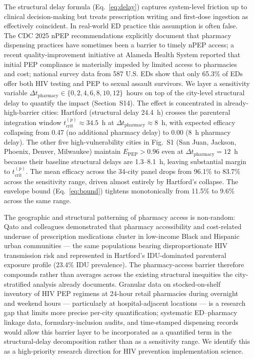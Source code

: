 \documentclass[10pt,letterpaper]{article}
\theoremstyle{definition}
\theoremstyle{remark}
\newcommand{\Epep}{E_{\text{PEP}}}
\newcommand{\tcrit}{t_{\text{crit}}}
\begin{document}
The structural delay formula (Eq.~\ref{eq:delay}) captures system-level friction up to clinical decision-making but treats prescription writing and first-dose ingestion as effectively coincident. In real-world ED practice this assumption is often false. The CDC 2025 nPEP recommendations explicitly document that pharmacy dispensing practices have sometimes been a barrier to timely nPEP access\cite{tanner2025}; a recent quality-improvement initiative at Alameda Health System reported that initial PEP compliance is materially impeded by limited access to pharmacies and cost\cite{white2025nPEP}; national survey data from 587 U.S. EDs show that only 65.3\% of EDs offer both HIV testing and PEP to sexual assault survivors\cite{lopezcastillo2020,white2025nPEP}. We layer a sensitivity variable $\Delta t_{\text{pharmacy}} \in \{0, 2, 4, 6, 8, 10, 12\}$~hours on top of the city-level structural delay to quantify the impact (Section~S14). The effect is concentrated in already-high-barrier cities: Hartford (structural delay 24.4~h) crosses the parenteral integration window $\tcrit^{(p)} \approx 34.5$~h at $\Delta t_{\text{pharmacy}} \approx 8$~h, with expected efficacy collapsing from 0.47 (no additional pharmacy delay) to 0.00 (8~h pharmacy delay). The other five high-vulnerability cities in Fig.~S1 (San Juan, Jackson, Phoenix, Denver, Milwaukee) maintain $\Epep > 0.96$ even at $\Delta t_{\text{pharmacy}} = 12$~h because their baseline structural delays are 1.3--8.1~h, leaving substantial margin to $\tcrit^{(p)}$. The mean efficacy across the 34-city panel drops from 96.1\% to 83.7\% across the sensitivity range, driven almost entirely by Hartford's collapse. The envelope bound (Eq.~\ref{eq:bound}) tightens monotonically from 11.5\% to 9.6\% across the same range.

The geographic and structural patterning of pharmacy access is non-random: Qato and colleagues demonstrated that pharmacy accessibility and cost-related underuse of prescription medications cluster in low-income Black and Hispanic urban communities\cite{qato2017} --- the same populations bearing disproportionate HIV transmission risk and represented in Hartford's IDU-dominated parenteral exposure profile (23.4\% IDU prevalence). The pharmacy-access barrier therefore compounds rather than averages across the existing structural inequities the city-stratified analysis already documents. Granular data on stocked-on-shelf inventory of HIV PEP regimens at 24-hour retail pharmacies during overnight and weekend hours --- particularly at hospital-adjacent locations --- is a research gap that limits more precise per-city quantification; systematic ED--pharmacy linkage data, formulary-inclusion audits, and time-stamped dispensing records would allow this barrier layer to be incorporated as a quantified term in the structural-delay decomposition rather than as a sensitivity range. We identify this as a high-priority research direction for HIV prevention implementation science.
\end{document}
